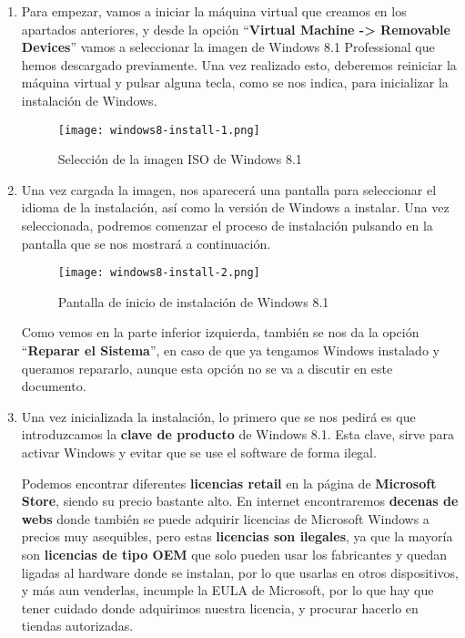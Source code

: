 \begin{enumerate}
    \item Para empezar, vamos a iniciar la máquina virtual que creamos en los apartados anteriores, y desde la opción ``\textbf{Virtual Machine -> Removable Devices}'' vamos a seleccionar la imagen de Windows 8.1 Professional que hemos descargado previamente. Una vez realizado esto, deberemos reiniciar la máquina virtual y pulsar alguna tecla, como se nos indica, para inicializar la instalación de Windows.

    \begin{figure}[H]
        \centering
        \texttt{[image: windows8-install-1.png]}
        \caption{Selección de la imagen ISO de Windows 8.1}
    \end{figure}

    \item Una vez cargada la imagen, nos aparecerá una pantalla para seleccionar el idioma de la instalación, así como la versión de Windows a instalar. Una vez seleccionada, podremos comenzar el proceso de instalación pulsando en la pantalla que se nos mostrará a continuación.

    \begin{figure}[H]
        \centering
        \texttt{[image: windows8-install-2.png]}
        \caption{Pantalla de inicio de instalación de Windows 8.1}
    \end{figure}

    Como vemos en la parte inferior izquierda, también se nos da la opción ``\textbf{Reparar el Sistema}'', en caso de que ya tengamos Windows instalado y queramos repararlo, aunque esta opción no se va a discutir en este documento.

    \item Una vez inicializada la instalación, lo primero que se nos pedirá es que introduzcamos la \textbf{clave de producto} de Windows 8.1. Esta clave, sirve para activar Windows y evitar que se use el software de forma ilegal.

    Podemos encontrar diferentes \textbf{licencias retail} en la página de \textbf{Microsoft Store}, siendo su precio bastante alto. En internet encontraremos \textbf{decenas de webs} donde también se puede adquirir licencias de Microsoft Windows a precios muy asequibles, pero estas \textbf{licencias son ilegales}, ya que la mayoría son \textbf{licencias de tipo OEM} que solo pueden usar los fabricantes y quedan ligadas al hardware donde se instalan, por lo que usarlas en otros dispositivos, y más aun venderlas, incumple la EULA de Microsoft, por lo que hay que tener cuidado donde adquirimos nuestra licencia, y procurar hacerlo en tiendas autorizadas.


\end{enumerate}
